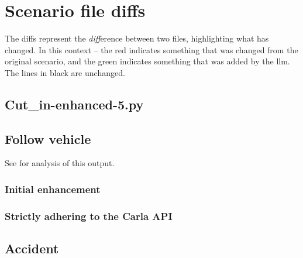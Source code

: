 \chapter{Scenario file diffs}\label{sec:fileDiffs}

The diffs represent the \emph{diff}erence between two files, highlighting what
has changed. In this context -- the red indicates something that was changed
from the original scenario, and the green indicates something that was added by
the \acrshort{llm}. The lines in black are unchanged.

\section{Cut\_in-enhanced-5.py }




\section{Follow vehicle}

See  for analysis of this output.

\subsection{Initial enhancement}




\subsection{Strictly adhering to the Carla API}



\section{Accident}\label{sec:appendixAccidentDiffs}

